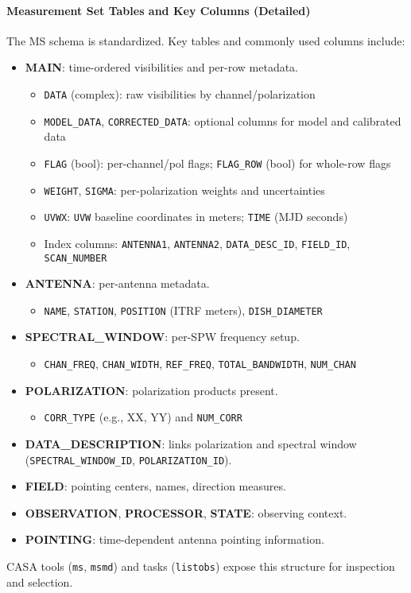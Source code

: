 \documentclass[11pt]{article}
\begin{document}
\paragraph{Measurement Set Tables and Key Columns (Detailed)}
The MS schema is standardized. Key tables and commonly used columns include:
\begin{itemize}
    \item \textbf{MAIN}: time-ordered visibilities and per-row metadata.
    \begin{itemize}
        \item \texttt{DATA} (complex): raw visibilities by channel/polarization
        \item \texttt{MODEL\_DATA}, \texttt{CORRECTED\_DATA}: optional columns for model and calibrated data
        \item \texttt{FLAG} (bool): per-channel/pol flags; \texttt{FLAG\_ROW} (bool) for whole-row flags
        \item \texttt{WEIGHT}, \texttt{SIGMA}: per-polarization weights and uncertainties
        \item \texttt{UVWX}: \texttt{UVW} baseline coordinates in meters; \texttt{TIME} (MJD seconds)
        \item Index columns: \texttt{ANTENNA1}, \texttt{ANTENNA2}, \texttt{DATA\_DESC\_ID}, \texttt{FIELD\_ID}, \texttt{SCAN\_NUMBER}
    \end{itemize}
    \item \textbf{ANTENNA}: per-antenna metadata.
    \begin{itemize}
        \item \texttt{NAME}, \texttt{STATION}, \texttt{POSITION} (ITRF meters), \texttt{DISH\_DIAMETER}
    \end{itemize}
    \item \textbf{SPECTRAL\_WINDOW}: per-SPW frequency setup.
    \begin{itemize}
        \item \texttt{CHAN\_FREQ}, \texttt{CHAN\_WIDTH}, \texttt{REF\_FREQ}, \texttt{TOTAL\_BANDWIDTH}, \texttt{NUM\_CHAN}
    \end{itemize}
    \item \textbf{POLARIZATION}: polarization products present.
    \begin{itemize}
        \item \texttt{CORR\_TYPE} (e.g., XX, YY) and \texttt{NUM\_CORR}
    \end{itemize}
    \item \textbf{DATA\_DESCRIPTION}: links polarization and spectral window (\texttt{SPECTRAL\_WINDOW\_ID}, \texttt{POLARIZATION\_ID}).
    \item \textbf{FIELD}: pointing centers, names, direction measures.
    \item \textbf{OBSERVATION}, \textbf{PROCESSOR}, \textbf{STATE}: observing context.
    \item \textbf{POINTING}: time-dependent antenna pointing information.
\end{itemize}
CASA tools (\texttt{ms}, \texttt{msmd}) and tasks (\texttt{listobs}) expose this structure for inspection and selection.
\end{document}
